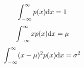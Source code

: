 $$ \int _{-\infty} ^\infty p(x) {\rm d}x = 1 $$
$$ \int _{-\infty} ^\infty xp(x) {\rm d}x = \mu $$
$$ \int _{-\infty} ^\infty (x-\mu)^2 p(x) {\rm d}x = \sigma ^2 $$
